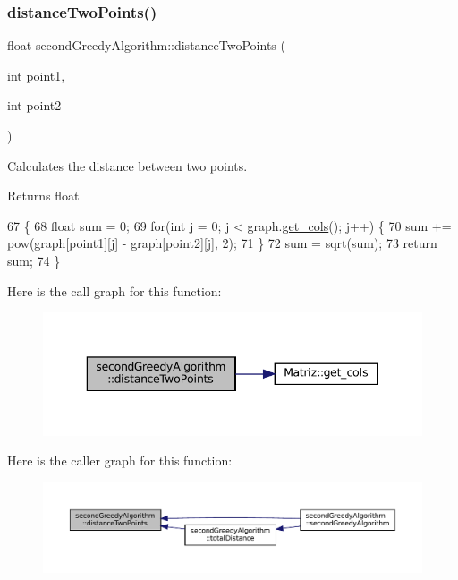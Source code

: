 \subsubsection{\texorpdfstring{distance\+Two\+Points()}{distanceTwoPoints()}}
{\footnotesize\ttfamily float second\+Greedy\+Algorithm\+::distance\+Two\+Points (\begin{DoxyParamCaption}\item[{int}]{point1,  }\item[{int}]{point2 }\end{DoxyParamCaption})}



Calculates the distance between two points. 

\begin{DoxyReturn}{Returns}
float 
\end{DoxyReturn}

\begin{DoxyCode}
67                                                                      \{
68   \textcolor{keywordtype}{float} sum = 0; 
69   \textcolor{keywordflow}{for}(\textcolor{keywordtype}{int} j = 0; j < graph.\hyperlink{classMatriz_ad6915f9b31f93230a3ce05d01d23a47b}{get\_cols}(); j++) \{
70     sum += pow(graph[point1][j] - graph[point2][j], 2);
71   \}
72   sum = sqrt(sum);
73   \textcolor{keywordflow}{return} sum;
74 \}
\end{DoxyCode}
Here is the call graph for this function\+:
\nopagebreak
\begin{figure}[H]
\begin{center}
\leavevmode
\includegraphics[width=343pt]{classsecondGreedyAlgorithm_a72574b0ef83083f7994af0eb4007cf39_cgraph}
\end{center}
\end{figure}
Here is the caller graph for this function\+:
\nopagebreak
\begin{figure}[H]
\begin{center}
\leavevmode
\includegraphics[width=350pt]{classsecondGreedyAlgorithm_a72574b0ef83083f7994af0eb4007cf39_icgraph}
\end{center}
\end{figure}
\mbox{\label{classsecondGreedyAlgorithm_a119a730116003d00438179ccf4e2cafd}} 
